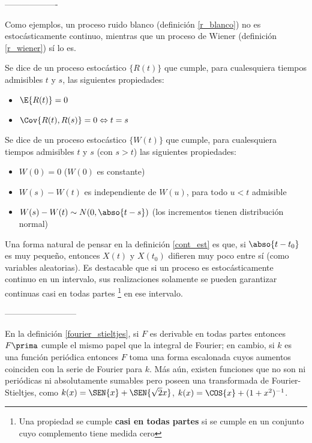 -------------------

Como ejemplos, un proceso ruido blanco (definici\'on \ref{r_blanco}) no es estoc\'asticamente 
continuo, mientras que un proceso de Wiener (definici\'on \ref{r_wiener}) s\'i lo es.

\begin{defn}
Se dice de un proceso estoc\'astico $\{ R(t) \}$ que cumple, para cualesquiera tiempos admisibles
$t$ y $s$, las siguientes propiedades:
\begin{itemize}
\item $\E{R(t)}=0$
\item $\Cov{R(t),R(s)}=0 \Leftrightarrow t=s$ 
\end{itemize}
\label{r_blanco}
\end{defn}

\begin{defn}
Se dice de un proceso estoc\'astico $\{ W(t) \}$ que cumple, para cualesquiera tiempos admisibles
$t$ y $s$ (con $s>t$) las siguientes propiedades:
\begin{itemize}
\item $W(0) = 0$ ($W(0)$ es constante)
\item $W(s)-W(t)$ es independiente de $W(u)$, para todo $u<t$ admisible
\item $W(s)-W(t) \sim N(0,\abso{t-s})$  (los incrementos tienen distribuci\'on normal)
\end{itemize}
\label{r_wiener}
\end{defn}

Una forma natural de pensar en la definici\'on \ref{cont_est} es que, si $\abso{t-t_0}$ es muy 
peque\~no, entonces $X(t)$ y $X(t_0)$ difieren muy poco entre s\'i (como variables aleatorias).
Es destacable que si un proceso es estoc\'asticamente continuo en un intervalo, sus realizaciones 
solamente se pueden garantizar continuas casi en todas partes \footnote{Una propiedad se cumple 
\textbf{casi en todas partes} si se cumple en un conjunto cuyo complemento tiene medida cero} en 
ese intervalo.

--------------------------

En la definici\'on \ref{fourier_stieltjes}, si $F$ es derivable en todas partes entonces $F\prima$ 
cumple el mismo papel que la integral de Fourier; en cambio, si $k$ es una funci\'on peri\'odica 
entonces $F$ toma una forma escalonada cuyos aumentos coinciden con la serie de Fourier para $k$. 
M\'as a\'un, existen funciones que no son ni peri\'odicas ni absolutamente sumables pero poseen 
una transformada de Fourier-Stieltjes, como $k(x)=\SEN{x}+\SEN{\sqrt{2}x}$, 
$k(x)=\COS{x} + (1+x^{2})^{-1}$.

